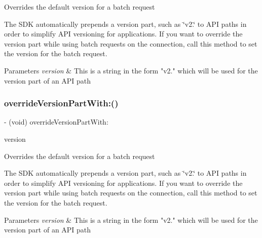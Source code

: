 Overrides the default version for a batch request

The S\+DK automatically prepends a version part, such as \char`\"{}v2.\char`\"{} to A\+PI paths in order to simplify A\+PI versioning for applications. If you want to override the version part while using batch requests on the connection, call this method to set the version for the batch request.


\begin{DoxyParams}{Parameters}
{\em version} & This is a string in the form "v2." which will be used for the version part of an A\+PI path \\
\hline
\end{DoxyParams}
\mbox{\label{interfaceFBRequestConnection_a225e5854a3413c22bff120114889ad07}} 
\subsubsection{\texorpdfstring{override\+Version\+Part\+With\+:()}{overrideVersionPartWith:()}\hspace{0.1cm}{\footnotesize\ttfamily [3/5]}}
{\footnotesize\ttfamily -\/ (void) override\+Version\+Part\+With\+: \begin{DoxyParamCaption}\item[{(N\+S\+String $\ast$)}]{version }\end{DoxyParamCaption}}

Overrides the default version for a batch request

The S\+DK automatically prepends a version part, such as \char`\"{}v2.\char`\"{} to A\+PI paths in order to simplify A\+PI versioning for applications. If you want to override the version part while using batch requests on the connection, call this method to set the version for the batch request.


\begin{DoxyParams}{Parameters}
{\em version} & This is a string in the form "v2." which will be used for the version part of an A\+PI path \\
\hline
\end{DoxyParams}
\mbox{\label{interfaceFBRequestConnection_a225e5854a3413c22bff120114889ad07}} 
